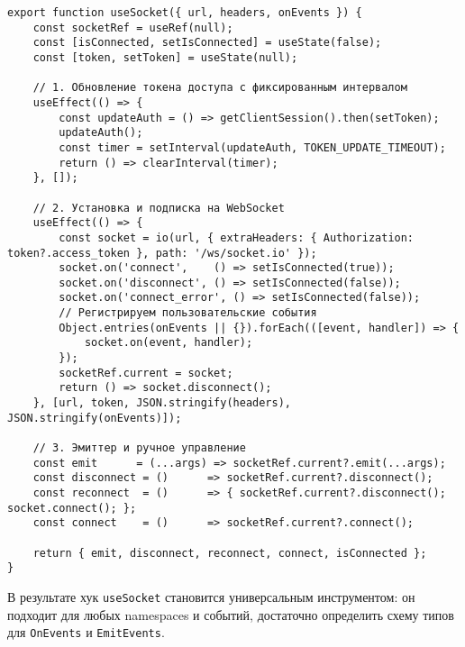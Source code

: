 \begin{lstlisting}[caption={Кастомный хук useSocket}, label={lst:useSocket}]
export function useSocket({ url, headers, onEvents }) {
    const socketRef = useRef(null);
    const [isConnected, setIsConnected] = useState(false);
    const [token, setToken] = useState(null);
    
    // 1. Обновление токена доступа с фиксированным интервалом
    useEffect(() => {
        const updateAuth = () => getClientSession().then(setToken);
        updateAuth();
        const timer = setInterval(updateAuth, TOKEN_UPDATE_TIMEOUT);
        return () => clearInterval(timer);
    }, []);
    
    // 2. Установка и подписка на WebSocket
    useEffect(() => {
        const socket = io(url, { extraHeaders: { Authorization: token?.access_token }, path: '/ws/socket.io' });
        socket.on('connect',    () => setIsConnected(true));
        socket.on('disconnect', () => setIsConnected(false));
        socket.on('connect_error', () => setIsConnected(false));
        // Регистрируем пользовательские события
        Object.entries(onEvents || {}).forEach(([event, handler]) => {
            socket.on(event, handler);
        });
        socketRef.current = socket;
        return () => socket.disconnect();
    }, [url, token, JSON.stringify(headers), JSON.stringify(onEvents)]);
    
    // 3. Эмиттер и ручное управление
    const emit      = (...args) => socketRef.current?.emit(...args);
    const disconnect = ()      => socketRef.current?.disconnect();
    const reconnect  = ()      => { socketRef.current?.disconnect(); socket.connect(); };
    const connect    = ()      => socketRef.current?.connect();
    
    return { emit, disconnect, reconnect, connect, isConnected };
}
\end{lstlisting}

В результате хук \texttt{useSocket} становится универсальным инструментом: он подходит для любых namespaces и событий, достаточно определить схему типов для \texttt{OnEvents} и \texttt{EmitEvents}.

